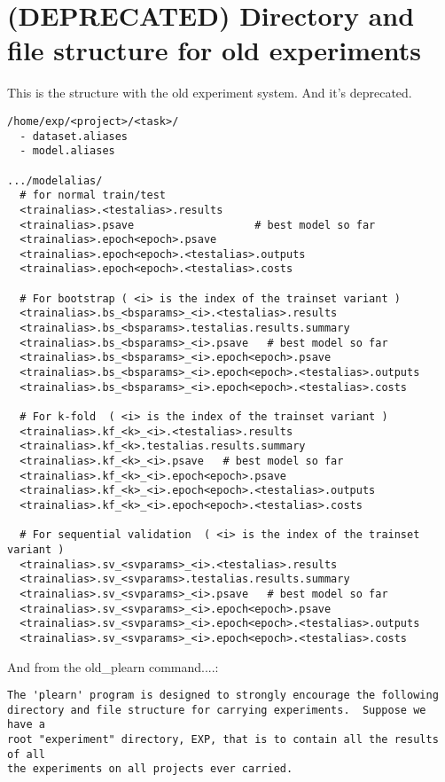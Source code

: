\documentclass[11pt]{book}
\begin{document}
{\chapter{(DEPRECATED) Directory and file structure for old experiments}

This is the structure with the old experiment system. And it's deprecated. 

\begin{verbatim}
/home/exp/<project>/<task>/
  - dataset.aliases
  - model.aliases
   
.../modelalias/
  # for normal train/test
  <trainalias>.<testalias>.results
  <trainalias>.psave                   # best model so far
  <trainalias>.epoch<epoch>.psave
  <trainalias>.epoch<epoch>.<testalias>.outputs
  <trainalias>.epoch<epoch>.<testalias>.costs

  # For bootstrap ( <i> is the index of the trainset variant )
  <trainalias>.bs_<bsparams>_<i>.<testalias>.results
  <trainalias>.bs_<bsparams>.testalias.results.summary
  <trainalias>.bs_<bsparams>_<i>.psave   # best model so far
  <trainalias>.bs_<bsparams>_<i>.epoch<epoch>.psave
  <trainalias>.bs_<bsparams>_<i>.epoch<epoch>.<testalias>.outputs
  <trainalias>.bs_<bsparams>_<i>.epoch<epoch>.<testalias>.costs

  # For k-fold  ( <i> is the index of the trainset variant )
  <trainalias>.kf_<k>_<i>.<testalias>.results
  <trainalias>.kf_<k>.testalias.results.summary
  <trainalias>.kf_<k>_<i>.psave   # best model so far
  <trainalias>.kf_<k>_<i>.epoch<epoch>.psave
  <trainalias>.kf_<k>_<i>.epoch<epoch>.<testalias>.outputs
  <trainalias>.kf_<k>_<i>.epoch<epoch>.<testalias>.costs
  
  # For sequential validation  ( <i> is the index of the trainset variant )
  <trainalias>.sv_<svparams>_<i>.<testalias>.results
  <trainalias>.sv_<svparams>.testalias.results.summary
  <trainalias>.sv_<svparams>_<i>.psave   # best model so far
  <trainalias>.sv_<svparams>_<i>.epoch<epoch>.psave
  <trainalias>.sv_<svparams>_<i>.epoch<epoch>.<testalias>.outputs
  <trainalias>.sv_<svparams>_<i>.epoch<epoch>.<testalias>.costs
\end{verbatim}

And from the old\_plearn command....:

\begin{verbatim}
The 'plearn' program is designed to strongly encourage the following
directory and file structure for carrying experiments.  Suppose we have a
root "experiment" directory, EXP, that is to contain all the results of all
the experiments on all projects ever carried.


\end{verbatim}}
\end{document}
